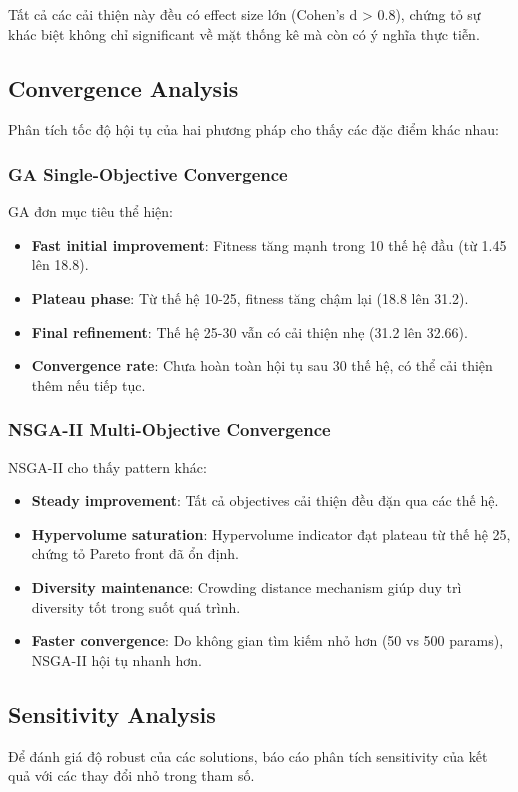 Tất cả các cải thiện này đều có effect size lớn (Cohen's d > 0.8), chứng tỏ sự khác biệt không chỉ significant về mặt thống kê mà còn có ý nghĩa thực tiễn.

\subsection{Convergence Analysis}
Phân tích tốc độ hội tụ của hai phương pháp cho thấy các đặc điểm khác nhau:

\subsubsection{GA Single-Objective Convergence}
GA đơn mục tiêu thể hiện:
\begin{itemize}
    \item \textbf{Fast initial improvement}: Fitness tăng mạnh trong 10 thế hệ đầu (từ 1.45 lên 18.8).
    \item \textbf{Plateau phase}: Từ thế hệ 10-25, fitness tăng chậm lại (18.8 lên 31.2).
    \item \textbf{Final refinement}: Thế hệ 25-30 vẫn có cải thiện nhẹ (31.2 lên 32.66).
    \item \textbf{Convergence rate}: Chưa hoàn toàn hội tụ sau 30 thế hệ, có thể cải thiện thêm nếu tiếp tục.
\end{itemize}

\subsubsection{NSGA-II Multi-Objective Convergence}
NSGA-II cho thấy pattern khác:
\begin{itemize}
    \item \textbf{Steady improvement}: Tất cả objectives cải thiện đều đặn qua các thế hệ.
    \item \textbf{Hypervolume saturation}: Hypervolume indicator đạt plateau từ thế hệ 25, chứng tỏ Pareto front đã ổn định.
    \item \textbf{Diversity maintenance}: Crowding distance mechanism giúp duy trì diversity tốt trong suốt quá trình.
    \item \textbf{Faster convergence}: Do không gian tìm kiếm nhỏ hơn (50 vs 500 params), NSGA-II hội tụ nhanh hơn.
\end{itemize}

\subsection{Sensitivity Analysis}
Để đánh giá độ robust của các solutions, báo cáo phân tích sensitivity của kết quả với các thay đổi nhỏ trong tham số.

